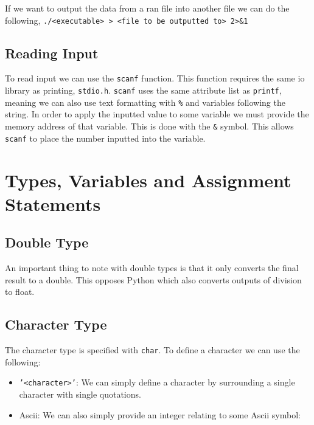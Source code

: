 \documentclass{report}
\begin{document}
   If we want to output the data from a ran file into another file we can do the following, \texttt{./<executable> > <file to be outputted to> 2>\&1}

   \subsection{Reading Input}
   To read input we can use the \texttt{scanf} function. This function requires the same io library as printing, \texttt{stdio.h}. \texttt{scanf} uses the same attribute list as \texttt{printf}, meaning we can also use text formatting with \texttt{\%} and variables following the string.
   In order to apply the inputted value to some variable we must provide the memory address of that variable. This is done with the \texttt{\&} symbol. This allows \texttt{scanf} to place the number inputted into the variable.


   \section{Types, Variables and Assignment Statements}

   \subsection{Double Type}
   An important thing to note with double types is that it only converts the final result to a double. This opposes Python which also converts outputs of division to float.

   \subsection{Character Type}
   The character type is specified with \texttt{char}. To define a character we can use the following:
   \begin{itemize}
      \item \texttt{'<character>'}: We can simply define a character by surrounding a single character with single quotations. 
      \item Ascii: We can also simply provide an integer relating to some Ascii symbol:
   \end{itemize}
\end{document}
